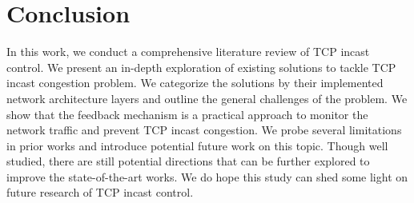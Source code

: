 \section{Conclusion}
\label{s:conclusion}
In this work, we conduct a comprehensive literature review of TCP incast control.
We present an in-depth exploration of existing solutions to tackle TCP incast congestion problem.
We categorize the solutions by their implemented network architecture layers and outline the general challenges of the problem.
We show that the feedback mechanism is a practical approach to monitor the network traffic and prevent TCP incast congestion.
We probe several limitations in prior works and introduce potential future work on this topic.
Though well studied, there are still potential directions that can be further explored to improve the state-of-the-art works.
We do hope this study can shed some light on future research of TCP incast control.
